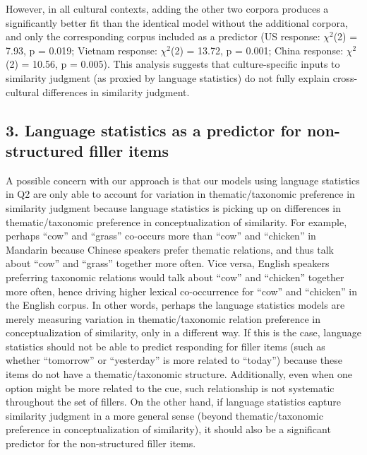 \documentclass[10pt, letterpaper]{article}
\begin{document}
However, in all cultural contexts, adding the other two corpora produces
a significantly better fit than the identical model without the
additional corpora, and only the corresponding corpus included as a
predictor (US response: \(\chi^2\)(2) = 7.93, p = 0.019; Vietnam
response: \(\chi^2\)(2) = 13.72, p = 0.001; China response:
\(\chi^2\)(2) = 10.56, p = 0.005). This analysis suggests that
culture-specific inputs to similarity judgment (as proxied by language
statistics) do not fully explain cross-cultural differences in
similarity judgment.

\hypertarget{language-statistics-as-a-predictor-for-non-structured-filler-items}{%
\subsection{3. Language statistics as a predictor for non-structured
filler
items}\label{language-statistics-as-a-predictor-for-non-structured-filler-items}}

A possible concern with our approach is that our models using language
statistics in Q2 are only able to account for variation in
thematic/taxonomic preference in similarity judgment because language
statistics is picking up on differences in thematic/taxonomic preference
in conceptualization of similarity. For example, perhaps ``cow'' and
``grass'' co-occurs more than ``cow'' and ``chicken'' in Mandarin
because Chinese speakers prefer thematic relations, and thus talk about
``cow'' and ``grass'' together more often. Vice versa, English speakers
preferring taxonomic relations would talk about ``cow'' and ``chicken''
together more often, hence driving higher lexical co-occurrence for
``cow'' and ``chicken'' in the English corpus. In other words, perhaps
the language statistics models are merely measuring variation in
thematic/taxonomic relation preference in conceptualization of
similarity, only in a different way. If this is the case, language
statistics should not be able to predict responding for filler items
(such as whether ``tomorrow'' or ``yesterday'' is more related to
``today'') because these items do not have a thematic/taxonomic
structure. Additionally, even when one option might be more related to
the cue, such relationship is not systematic throughout the set of
fillers. On the other hand, if language statistics capture similarity
judgment in a more general sense (beyond thematic/taxonomic preference
in conceptualization of similarity), it should also be a significant
predictor for the non-structured filler items.
\end{document}
